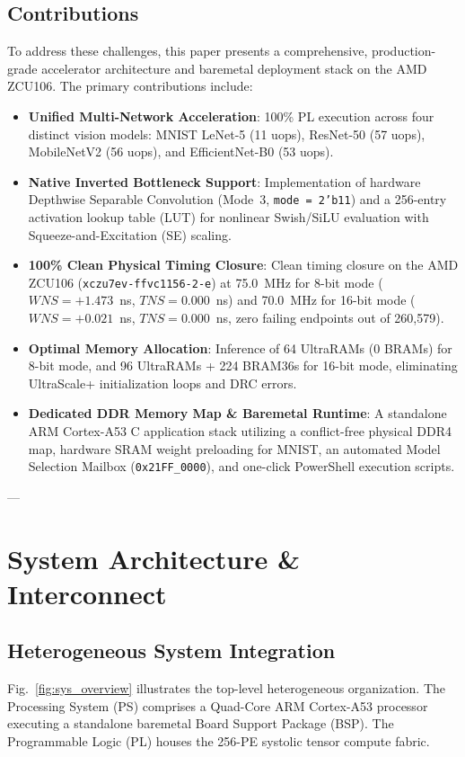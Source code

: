 \documentclass[10pt,journal,compsoc]{IEEEtran}
\begin{document}
\subsection{Contributions}
To address these challenges, this paper presents a comprehensive, production-grade accelerator architecture and baremetal deployment stack on the AMD ZCU106. The primary contributions include:
\begin{itemize}
    \item \textbf{Unified Multi-Network Acceleration}: 100\% PL execution across four distinct vision models: MNIST LeNet-5 (11 uops), ResNet-50 (57 uops), MobileNetV2 (56 uops), and EfficientNet-B0 (53 uops).
    \item \textbf{Native Inverted Bottleneck Support}: Implementation of hardware Depthwise Separable Convolution (Mode~3, \texttt{mode = 2'b11}) and a 256-entry activation lookup table (LUT) for nonlinear Swish/SiLU evaluation with Squeeze-and-Excitation (SE) scaling.
    \item \textbf{100\% Clean Physical Timing Closure}: Clean timing closure on the AMD ZCU106 (\texttt{xczu7ev-ffvc1156-2-e}) at 75.0~MHz for 8-bit mode ($WNS = +1.473$~ns, $TNS = 0.000$~ns) and 70.0~MHz for 16-bit mode ($WNS = +0.021$~ns, $TNS = 0.000$~ns, zero failing endpoints out of 260,579).
    \item \textbf{Optimal Memory Allocation}: Inference of 64 UltraRAMs (0 BRAMs) for 8-bit mode, and 96 UltraRAMs + 224 BRAM36s for 16-bit mode, eliminating UltraScale+ initialization loops and DRC errors.
    \item \textbf{Dedicated DDR Memory Map \& Baremetal Runtime}: A standalone ARM Cortex-A53 C application stack utilizing a conflict-free physical DDR4 map, hardware SRAM weight preloading for MNIST, an automated Model Selection Mailbox (\texttt{0x21FF\_0000}), and one-click PowerShell execution scripts.
\end{itemize}

---

\section{System Architecture \& Interconnect}

\subsection{Heterogeneous System Integration}
Fig.~\ref{fig:sys_overview} illustrates the top-level heterogeneous organization. The Processing System (PS) comprises a Quad-Core ARM Cortex-A53 processor executing a standalone baremetal Board Support Package (BSP). The Programmable Logic (PL) houses the 256-PE systolic tensor compute fabric.
\end{document}
